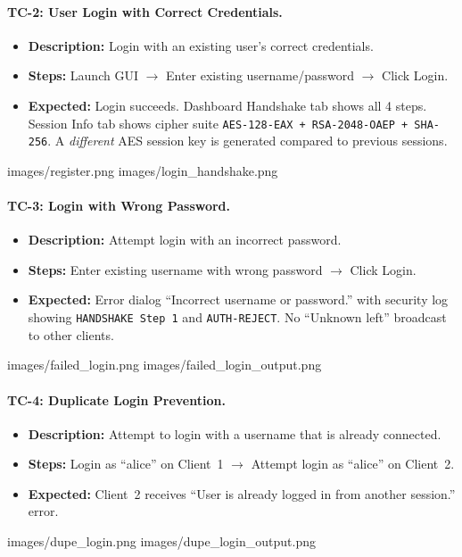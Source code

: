 \documentclass[12pt,a4paper]{article}
\begin{document}
\paragraph{TC-2: User Login with Correct Credentials.}
\begin{itemize}
    \item \textbf{Description:} Login with an existing user's correct credentials.
    \item \textbf{Steps:} Launch GUI $\to$ Enter existing username/password $\to$ Click Login.
    \item \textbf{Expected:} Login succeeds. Dashboard Handshake tab shows all 4 steps. Session Info tab shows cipher suite \texttt{AES-128-EAX + RSA-2048-OAEP + SHA-256}. A \textit{different} AES session key is generated compared to previous sessions.
\end{itemize}
    {images/register.png}%
    {images/login_handshake.png}%

\paragraph{TC-3: Login with Wrong Password.}
\begin{itemize}
    \item \textbf{Description:} Attempt login with an incorrect password.
    \item \textbf{Steps:} Enter existing username with wrong password $\to$ Click Login.
    \item \textbf{Expected:} Error dialog ``Incorrect username or password.'' with security log showing \texttt{HANDSHAKE Step 1} and \texttt{AUTH-REJECT}. No ``Unknown left'' broadcast to other clients.
\end{itemize}
    {images/failed_login.png}%
    {images/failed_login_output.png}%

\paragraph{TC-4: Duplicate Login Prevention.}
\begin{itemize}
    \item \textbf{Description:} Attempt to login with a username that is already connected.
    \item \textbf{Steps:} Login as ``alice'' on Client~1 $\to$ Attempt login as ``alice'' on Client~2.
    \item \textbf{Expected:} Client~2 receives ``User is already logged in from another session.'' error.
\end{itemize}
    {images/dupe_login.png}%
    {images/dupe_login_output.png}%
\end{document}
